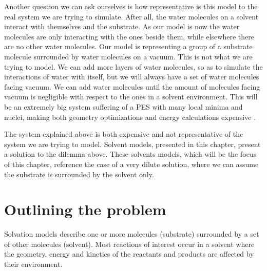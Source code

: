 \documentclass[../master_thesis.tex]{subfiles}
\begin{document}
Another question we can ask ourselves is how representative is this model to the
real system we are trying to simulate. After all, the water molecules on a solvent interact
with themselves and the substrate. As our model is now the water molecules are
only interacting with the ones beside them, while elsewhere there are no other water
molecules. Our model is representing a group of a substrate molecule surrounded
by water molecules on a vacuum. This is not what we are trying to model. We can add
more layers of water molecules, so as to simulate the interactions of water with
itself, but we will always have a set of water molecules facing vacuum.
We can add water molecules until the amount of molecules facing vacuum is negligible
with respect to the ones in a solvent environment. This will be an extremely big
system suffering of a \ac{PES} with many local minima and nuclei, making both
geometry optimizations and energy calculations expensive \cite{Jensen:2017}.

The system explained above is both expensive and not representative of the system we are trying
to model. Solvent models, presented in this chapter, present a solution to the dilemma above.
These solvents models, which will be the focus of this chapter, reference the case of a very dilute
solution, where we can assume the substrate is surrounded by the solvent only.

\section{Outlining the problem}
Solvation models describe one or more molecules (substrate) surrounded by
a set of other molecules (solvent). Most reactions of interest occur in a
solvent where the geometry, energy and kinetics of the reactants and products
are affected by their environment\cite{Mennucci:2018}.
\end{document}
